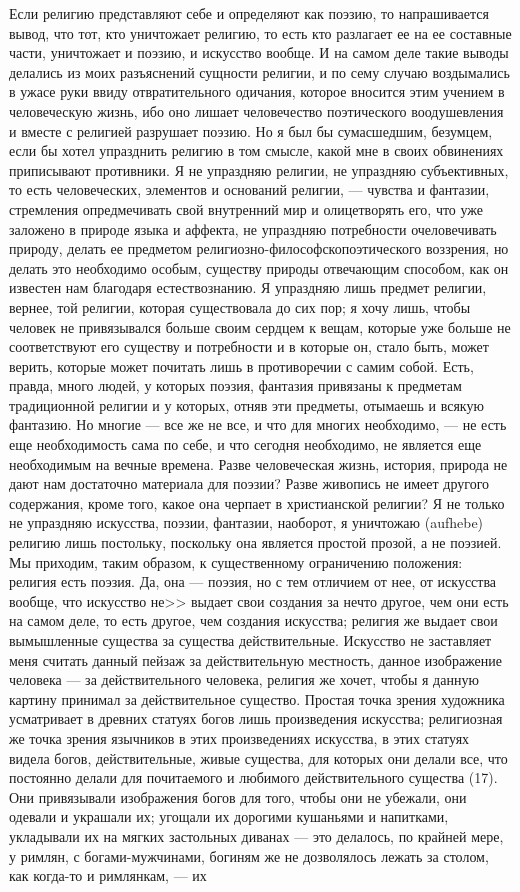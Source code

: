 \documentclass[12pt]{article}
\begin{document}
Если религию представляют себе и определяют как поэзию, то напрашивается вывод, что тот, кто уничтожает религию, то есть кто разлагает ее на ее составные части, уничтожает и поэзию, и искусство вообще. И на самом деле такие выводы делались из моих разъяснений сущности религии, и по сему случаю воздымались в ужасе руки ввиду отвратительного одичания, которое вносится этим учением в человеческую жизнь, ибо оно лишает человечество поэтического воодушевления и вместе с религией разрушает поэзию. Но я был бы сумасшедшим, безумцем, если бы хотел упразднить религию в том смысле, какой мне в своих обвинениях приписывают противники. Я не упраздняю религии, не упраздняю субъективных, то есть человеческих, элементов и оснований религии, --- чувства и фантазии, стремления опредмечивать свой внутренний мир и олицетворять его, что уже заложено в природе языка и аффекта, не упраздняю потребности очеловечивать природу, делать ее предметом религиозно-философскопоэтического воззрения, но делать это необходимо особым, существу природы отвечающим способом, как он известен нам благодаря естествознанию. Я упраздняю лишь предмет религии, вернее, той религии, которая существовала до сих пор; я хочу лишь, чтобы человек не привязывался больше своим сердцем к вещам, которые уже больше не соответствуют его существу и потребности и в которые он, стало быть, может верить, которые может почитать лишь в противоречии с самим собой. Есть, правда, много людей, у которых поэзия, фантазия привязаны к предметам традиционной религии и у которых, отняв эти предметы, отымаешь и всякую фантазию. Но многие --- все же не все, и что для многих необходимо, --- не есть еще необходимость сама по себе, и что сегодня необходимо, не является еще необходимым на вечные времена. Разве человеческая жизнь, история, природа не дают нам достаточно материала для поэзии? Разве живопись не имеет другого содержания, кроме того, какое она черпает в христианской религии? Я не только не упраздняю искусства, поэзии, фантазии, наоборот, я уничтожаю (aufhebe) религию лишь постольку, поскольку она является простой прозой, а не поэзией. Мы приходим, таким образом, к существенному ограничению положения: религия есть поэзия. Да, она --- поэзия, но с тем отличием от нее, от искусства вообще, что искусство не>> выдает свои создания за нечто другое, чем они есть на самом деле, то есть другое, чем создания искусства; религия же выдает свои вымышленные существа за существа действительные. Искусство не заставляет меня считать данный пейзаж за действительную местность, данное изображение человека --- за действительного человека, религия же хочет, чтобы я данную картину принимал за действительное существо. Простая точка зрения художника усматривает в древних статуях богов лишь произведения искусства; религиозная же точка зрения язычников в этих произведениях искусства, в этих статуях видела богов, действительные, живые существа, для которых они делали все, что постоянно делали для почитаемого и любимого действительного существа (17). Они привязывали изображения богов для того, чтобы они не убежали, они одевали и украшали их; угощали их дорогими кушаньями и напитками, укладывали их на мягких застольных диванах --- это делалось, по крайней мере, у римлян, с богами-мужчинами, богиням же не дозволялось лежать за столом, как когда-то и римлянкам, --- их 
\end{document}
